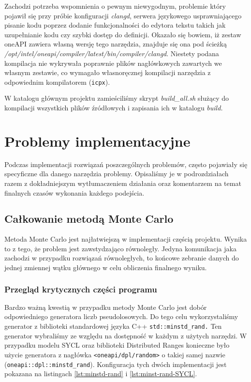 \documentclass[a4paper,12pt]{book} %
\begin{document}
Zachodzi potrzeba wspomnienia o pewnym niewygodnym, problemie który pojawił się przy próbie konfiguracji \emph{clangd}, serwera językowego usprawniającego pisanie kodu poprzez dodanie funkcjonalności do edytora tekstu takich jak uzupełnianie kodu czy szybki dostęp do definicji. Okazało się bowiem, iż zestaw oneAPI zawiera własną wersję tego narzędzia, znajduje się ona pod ścieżką \emph{/opt/intel/oneapi/compiler/latest/bin/compiler/clangd}. Niestety podana kompilacja nie wykrywała poprawnie plików nagłówkowych zawartych we własnym zestawie, co wymagało własnoręcznej kompilacji narzędzia z odpowiednim kompilatorem (\texttt{icpx}).

W katalogu głównym projektu zamieściliśmy skrypt \emph{build\_all.sh} służący do kompilacji wszystkich plików źródłowych i zapisania ich w katalogu \emph{build.}

\chapter{Problemy implementacyjne}
Podczas implementacji rozwiązań poszczególnych problemów, często pojawiały się specyficzne dla danego narzędzia problemy. Opisaliśmy je w podrozdziałach razem z dokładniejszym wytłumaczeniem działania oraz komentarzem na temat finalnych czasów wykonania każdego podejścia.
\section{Całkowanie metodą Monte Carlo}
Metoda Monte Carlo jest najłatwiejszą w implementacji częścią projektu. Wynika to z tego, że problem jest zawstydzająco równoległy. Jedyna komunikacja jaka zachodzi w przypadku rozwiązań równoległych, to końcowe zebranie danych do jednej zmiennej wątku głównego w celu obliczenia finalnego wyniku.
\subsection{Przegląd krytycznych części programu}
Bardzo ważną kwestią w przypadku metody Monte Carlo jest dobór odpowiedniego generatora liczb pseudolosowych. Do tego celu wykorzystaliśmy generator z biblioteki standardowej języka C++ \texttt{std::minstd\_rand.} Ten generator wybraliśmy ze względu na dostępność w każdym z użytych narzędzi. W przypadku modelu SYCL oraz biblioteki Distributed Ranges konieczne było użycie generatora z nagłówka \texttt{<oneapi/dpl/random>} o takiej samej nazwie (\texttt{oneapi::dpl::minstd\_rand}). Konfiguracja tych dwóch implementacji jest pokazana na listingach \ref{lst:minstd-rand} i \ref{lst:minst-rand-SYCL}.
\end{document}
